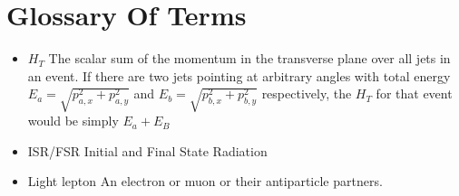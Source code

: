 \chapter{Glossary Of Terms}

\begin{itemize}
\item{$H_T$} The scalar sum of the momentum in the transverse plane over all jets in an event. If there are two jets pointing at arbitrary angles with total energy $E_a=\sqrt{p_{a,x}^2 + p_{a,y}^2}$ and $E_b=\sqrt{p_{b,x}^2 + p_{b,y}^2}$ respectively, the $H_T$ for that event would be simply $E_a + E_B$

\item{ISR/FSR} Initial and Final State Radiation

\item {Light lepton} An electron or muon or their antiparticle partners.
\end{itemize}